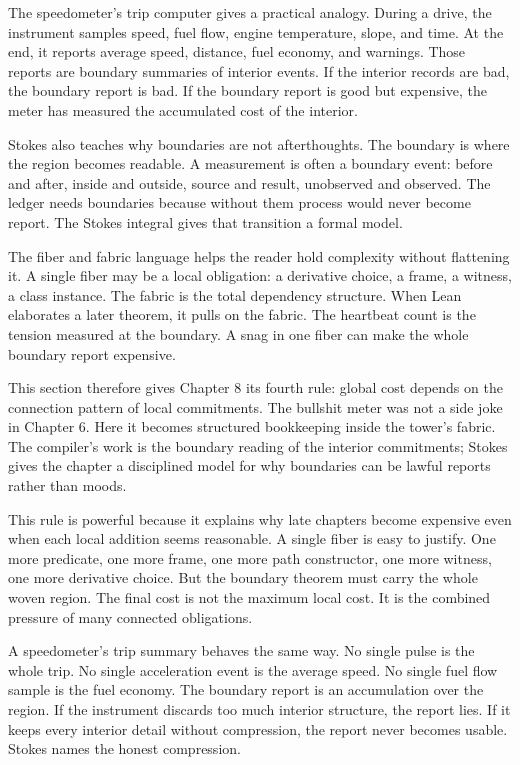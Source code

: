 The speedometer's trip computer gives a practical analogy. During a drive, the
instrument samples speed, fuel flow, engine temperature, slope, and time. At
the end, it reports average speed, distance, fuel economy, and warnings. Those
reports are boundary summaries of interior events. If the interior records are
bad, the boundary report is bad. If the boundary report is good but expensive,
the meter has measured the accumulated cost of the interior.

Stokes also teaches why boundaries are not afterthoughts. The boundary is where
the region becomes readable. A measurement is often a boundary event: before
and after, inside and outside, source and result, unobserved and observed. The
ledger needs boundaries because without them process would never become report.
The Stokes integral gives that transition a formal model.

The fiber and fabric language helps the reader hold complexity without
flattening it. A single fiber may be a local obligation: a derivative choice, a
frame, a witness, a class instance. The fabric is the total dependency
structure. When Lean elaborates a later theorem, it pulls on the fabric. The
heartbeat count is the tension measured at the boundary. A snag in one fiber
can make the whole boundary report expensive.

This section therefore gives Chapter 8 its fourth rule: global cost depends on
the connection pattern of local commitments. The bullshit meter was not a side
joke in Chapter 6. Here it becomes structured bookkeeping inside the tower's
fabric. The compiler's work is the boundary reading of the interior
commitments; Stokes gives the chapter a disciplined model for why boundaries
can be lawful reports rather than moods.

This rule is powerful because it explains why late chapters become expensive
even when each local addition seems reasonable. A single fiber is easy to
justify. One more predicate, one more frame, one more path constructor, one more
witness, one more derivative choice. But the boundary theorem must carry the
whole woven region. The final cost is not the maximum local cost. It is the
combined pressure of many connected obligations.

A speedometer's trip summary behaves the same way. No single pulse is the
whole trip. No single acceleration event is the average speed. No single fuel
flow sample is the fuel economy. The boundary report is an accumulation over
the region. If the instrument discards too much interior structure, the report
lies. If it keeps every interior detail without compression, the report never
becomes usable. Stokes names the honest compression.

